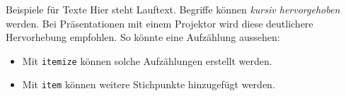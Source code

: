 
\begin{frame}{Beispiele für Texte}
Hier steht Lauftext. Begriffe können \emph{kursiv hervorgehoben} werden. Bei Präsentationen mit einem Projektor wird diese \alert{deutlichere Hervorhebung} empfohlen.
\newline
\newline
\newline
So könnte eine Aufzählung aussehen:
\begin{itemize}[label=\textbullet]
  \item Mit \texttt{itemize} können solche Aufzählungen erstellt werden.
  \item Mit \texttt{item} können weitere Stichpunkte hinzugefügt werden.
\end{itemize}
\end{frame}